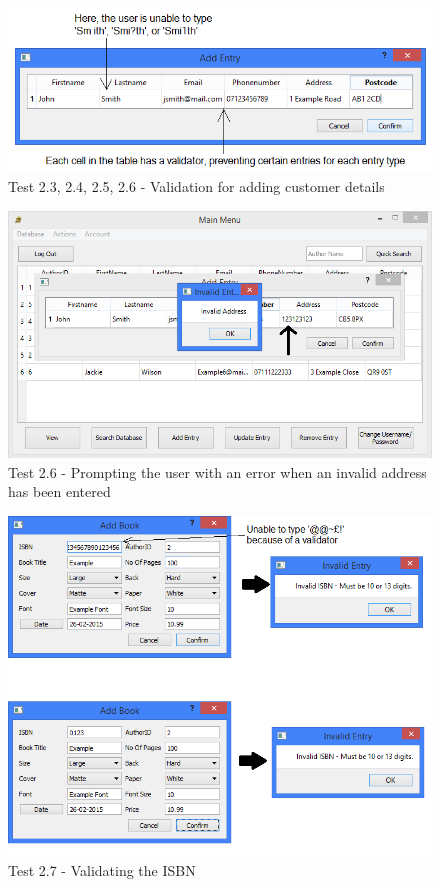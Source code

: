 \begin{landscape}
\begin{figure}[H]
    \includegraphics[width=\textwidth]{./Testing/Evidence/Series2/AddEntryValidation.png}
    \caption{Test 2.3, 2.4, 2.5, 2.6 - Validation for adding customer details}  \label{fig:AddEntryValidation}
\end{figure}

\begin{figure}[H]
    \includegraphics[width=\textwidth]{./Testing/Evidence/Series2/InvalidAddress.png}
    \caption{Test 2.6 - Prompting the user with an error when an invalid address has been entered}  \label{fig:InvalidAddress}
\end{figure}

\begin{figure}[H]
    \includegraphics[width=\textwidth]{./Testing/Evidence/Series2/ISBNRejection.png}
    \caption{Test 2.7 - Validating the ISBN}  \label{fig:ISBNRejection}
\end{figure}


\end{landscape}
